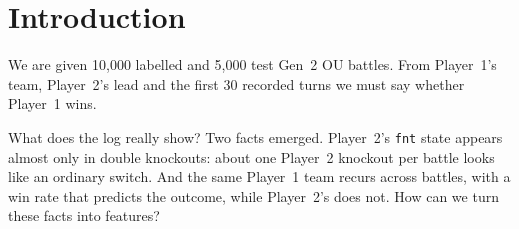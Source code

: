 \section{Introduction}
\label{sec:intro}

We are given 10,000 labelled and 5,000 test Gen~2 OU battles. From Player~1's team, Player~2's lead and the
first 30 recorded turns we must say whether Player~1 wins.

What does the log really show? Two facts emerged. Player~2's
\texttt{fnt} state appears almost only in double knockouts: about one Player~2 knockout per battle
looks like an ordinary switch. And the same Player~1 team recurs across battles, with a win rate
that predicts the outcome, while Player~2's does not. How can we turn these facts into features?
